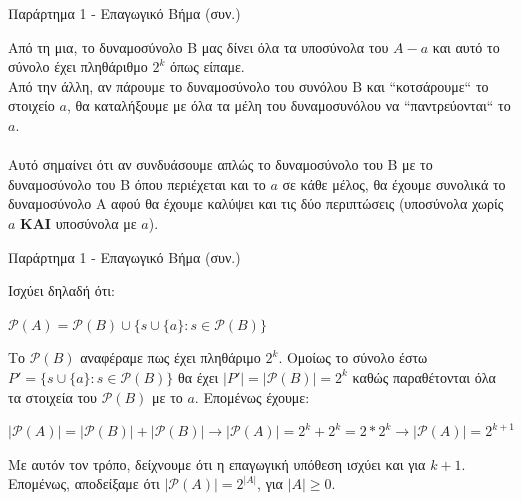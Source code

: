\documentclass[size=14pt, paper=smartboard, style=fyma, mode=present]{powerdot}
\begin{document}
\begin{slide}[toc=]{Παράρτημα 1 - Επαγωγικό Βήμα (συν.)}
	{\Large	
		Από τη μια, το δυναμοσύνολο Β μας δίνει όλα τα υποσύνολα του $Α - {a}$ και αυτό το σύνολο έχει πληθάριθμο $2^k$ όπως είπαμε. \\ 
		Από την άλλη, αν πάρουμε το δυναμοσύνολο του συνόλου Β και ``κοτσάρουμε`` το στοιχείο $a$, θα καταλήξουμε με όλα τα μέλη του δυναμοσυνόλου να ``παντρεύονται`` το $a$. 
		\\~\\
		Αυτό σημαίνει ότι αν συνδυάσουμε απλώς το δυναμοσύνολο του Β με το δυναμοσύνολο του Β όπου περιέχεται και το $a$ σε κάθε μέλος, θα έχουμε συνολικά το δυναμοσύνολο Α αφού θα έχουμε καλύψει και τις δύο περιπτώσεις (υποσύνολα χωρίς $a$ \textbf{ΚΑΙ} υποσύνολα με $a$).
		
	}
\end{slide}
\begin{slide}[toc=]{Παράρτημα 1 - Επαγωγικό Βήμα (συν.)}
	{\Large	
		Ισχύει δηλαδή ότι:
		\begin{center}
			$\mathcal{P}(A) = \mathcal{P}(B) \cup \{s \cup \{a\}: s \in \mathcal{P}(B)\}$
		\end{center}
	Το $\mathcal{P}(B)$ αναφέραμε πως έχει πληθάριμο $2^k$. Ομοίως το σύνολο έστω $P' =  \{s \cup \{a\}: s \in \mathcal{P}(B)\}$ θα έχει $|P'| = |\mathcal{P}(B)| = 2^k$ καθώς παραθέτονται όλα τα στοιχεία του $\mathcal{P}(B)$ με το $a$. Επομένως έχουμε:
	\boldmath
	\begin{center}
		$|\mathcal{P}(A)| = |\mathcal{P}(B)|+|\mathcal{P}(B)| \to
		|\mathcal{P}(A)| = 2^k + 2^k = 2*2^k \to 
		|\mathcal{P}(A)| = 2^{k+1}
		$
	\end{center}
	\unboldmath
	Με αυτόν τον τρόπο, δείχνουμε ότι η επαγωγική υπόθεση ισχύει και για $k+1$. Επομένως, αποδείξαμε ότι $|\mathcal{P}(A)|=2^{|A|}$, για $|Α| \ge 0$.
	}
\end{slide}
\end{document}
